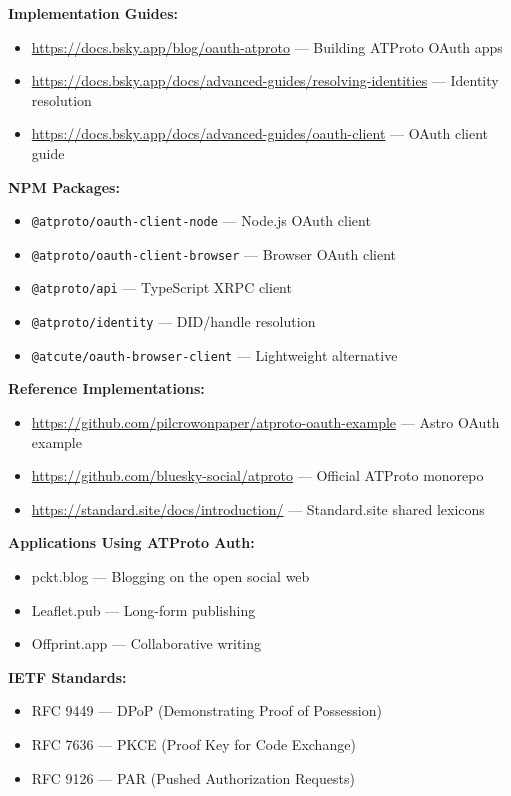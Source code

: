 \documentclass[10pt,letterpaper,twocolumn]{article}
\begin{document}
\textbf{Implementation Guides:}
\begin{itemize}
  \item \url{https://docs.bsky.app/blog/oauth-atproto} --- Building ATProto OAuth apps
  \item \url{https://docs.bsky.app/docs/advanced-guides/resolving-identities} --- Identity resolution
  \item \url{https://docs.bsky.app/docs/advanced-guides/oauth-client} --- OAuth client guide
\end{itemize}

\textbf{NPM Packages:}
\begin{itemize}
  \item \texttt{@atproto/oauth-client-node} --- Node.js OAuth client
  \item \texttt{@atproto/oauth-client-browser} --- Browser OAuth client
  \item \texttt{@atproto/api} --- TypeScript XRPC client
  \item \texttt{@atproto/identity} --- DID/handle resolution
  \item \texttt{@atcute/oauth-browser-client} --- Lightweight alternative
\end{itemize}

\textbf{Reference Implementations:}
\begin{itemize}
  \item \url{https://github.com/pilcrowonpaper/atproto-oauth-example} --- Astro OAuth example
  \item \url{https://github.com/bluesky-social/atproto} --- Official ATProto monorepo
  \item \url{https://standard.site/docs/introduction/} --- Standard.site shared lexicons
\end{itemize}

\textbf{Applications Using ATProto Auth:}
\begin{itemize}
  \item pckt.blog --- Blogging on the open social web
  \item Leaflet.pub --- Long-form publishing
  \item Offprint.app --- Collaborative writing
\end{itemize}

\textbf{IETF Standards:}
\begin{itemize}
  \item RFC 9449 --- DPoP (Demonstrating Proof of Possession)
  \item RFC 7636 --- PKCE (Proof Key for Code Exchange)
  \item RFC 9126 --- PAR (Pushed Authorization Requests)
\end{itemize}

\vspace{0.5em}



\end{document}
